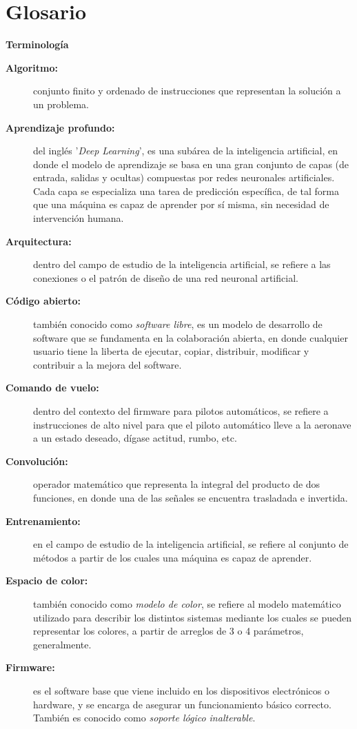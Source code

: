 \chapter*{Glosario}

\textbf{  \normalsize Terminología}
\begin{description}
  \item[\textbf{Algoritmo:}] conjunto finito y ordenado de instrucciones que representan la solución a un problema.
  \item[\textbf{Aprendizaje profundo:}] del inglés '\textit{Deep Learning}', es una subárea de la inteligencia artificial, en donde el modelo de aprendizaje se basa en una gran conjunto de capas (de entrada, salidas y ocultas) compuestas por redes neuronales artificiales. Cada capa se especializa una tarea de predicción específica, de tal forma que una máquina es capaz de aprender por sí misma, sin necesidad de intervención humana.
  \item[\textbf{Arquitectura:}] dentro del campo de estudio de la inteligencia artificial, se refiere a las conexiones o el patrón de diseño de una red neuronal artificial.
  \item[\textbf{Código abierto:}] también conocido como \textit{software libre}, es un modelo de desarrollo de software que se fundamenta en la colaboración abierta, en donde cualquier usuario tiene la liberta de ejecutar, copiar, distribuir, modificar y contribuir a la mejora del software. 
  \item[\textbf{Comando de vuelo:}] dentro del contexto del firmware para pilotos automáticos, se refiere a instrucciones de alto nivel para que el piloto automático lleve a la aeronave a un estado deseado, dígase actitud, rumbo, etc.
  \item[\textbf{Convolución:}] operador matemático que representa la integral del producto de dos funciones, en donde una de las señales se encuentra trasladada e invertida. 
  \item[\textbf{Entrenamiento:}] en el campo de estudio de la inteligencia artificial, se refiere al conjunto de métodos a partir de los cuales una máquina es capaz de aprender.
  \item[\textbf{Espacio de color:}] también conocido como \textit{modelo de color}, se refiere al modelo matemático utilizado para describir los distintos sistemas mediante los cuales se pueden representar los colores, a partir de arreglos de 3 o 4 parámetros, generalmente.
  \item[\textbf{Firmware:}] es el software base que viene incluido en los dispositivos electrónicos o hardware, y se encarga de asegurar un funcionamiento básico correcto. También es conocido como \textit{soporte lógico inalterable}.

\end{description}
